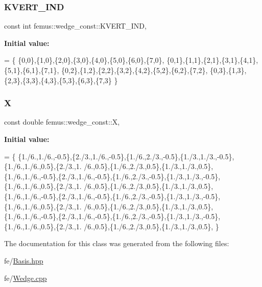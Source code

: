 \subsubsection{\texorpdfstring{K\+V\+E\+R\+T\+\_\+\+I\+ND}{KVERT\_IND}}
{\footnotesize\ttfamily const int femus\+::wedge\+\_\+const\+::\+K\+V\+E\+R\+T\+\_\+\+I\+ND\hspace{0.3cm}{\ttfamily [static]}, {\ttfamily [protected]}}

{\bfseries Initial value\+:}
\begin{DoxyCode}
= \{
    \{0,0\},\{1,0\},\{2,0\},\{3,0\},\{4,0\},\{5,0\},\{6,0\},\{7,0\},
    \{0,1\},\{1,1\},\{2,1\},\{3,1\},\{4,1\},\{5,1\},\{6,1\},\{7,1\},
    \{0,2\},\{1,2\},\{2,2\},\{3,2\},\{4,2\},\{5,2\},\{6,2\},\{7,2\},
    \{0,3\},\{1,3\},\{2,3\},\{3,3\},\{4,3\},\{5,3\},\{6,3\},\{7,3\}
  \}
\end{DoxyCode}
\mbox{\label{classfemus_1_1wedge__const_af0e0f33a2a30353d2dad4b72ec656e5d}} 
\subsubsection{\texorpdfstring{X}{X}}
{\footnotesize\ttfamily const double femus\+::wedge\+\_\+const\+::X\hspace{0.3cm}{\ttfamily [static]}, {\ttfamily [protected]}}

{\bfseries Initial value\+:}
\begin{DoxyCode}
= \{
    \{1./6.,1./6.,-0.5\},\{2./3.,1./6.,-0.5\},\{1./6.,2./3.,-0.5\},\{1./3.,1./3.,-0.5\},\{1./6.,1./6.,0.5\},\{2./3.,1.
      /6.,0.5\},\{1./6.,2./3.,0.5\},\{1./3.,1./3.,0.5\},
    \{1./6.,1./6.,-0.5\},\{2./3.,1./6.,-0.5\},\{1./6.,2./3.,-0.5\},\{1./3.,1./3.,-0.5\},\{1./6.,1./6.,0.5\},\{2./3.,1.
      /6.,0.5\},\{1./6.,2./3.,0.5\},\{1./3.,1./3.,0.5\},
    \{1./6.,1./6.,-0.5\},\{2./3.,1./6.,-0.5\},\{1./6.,2./3.,-0.5\},\{1./3.,1./3.,-0.5\},\{1./6.,1./6.,0.5\},\{2./3.,1.
      /6.,0.5\},\{1./6.,2./3.,0.5\},\{1./3.,1./3.,0.5\},
    \{1./6.,1./6.,-0.5\},\{2./3.,1./6.,-0.5\},\{1./6.,2./3.,-0.5\},\{1./3.,1./3.,-0.5\},\{1./6.,1./6.,0.5\},\{2./3.,1.
      /6.,0.5\},\{1./6.,2./3.,0.5\},\{1./3.,1./3.,0.5\},
  \}
\end{DoxyCode}


The documentation for this class was generated from the following files\+:\begin{DoxyCompactItemize}
\item 
fe/\mbox{\hyperlink{_basis_8hpp}{Basis.\+hpp}}\item 
fe/\mbox{\hyperlink{_wedge_8cpp}{Wedge.\+cpp}}\end{DoxyCompactItemize}
